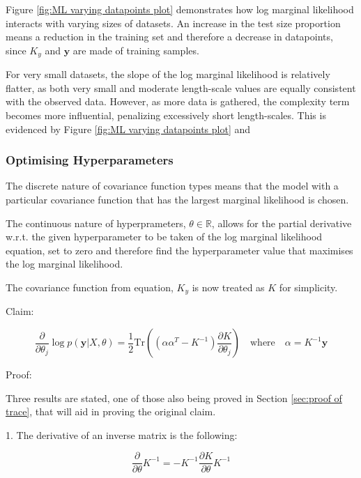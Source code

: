 \documentclass[12pt,a4paper]{article}
\begin{document}
Figure \ref{fig:ML varying datapoints plot} demonstrates how log marginal likelihood interacts with varying sizes of datasets. An increase in the test size proportion means a reduction in the training set and therefore a decrease in datapoints, since \(K_y\) and \(\mathbf{y}\) are made of training samples.

For very small datasets, the slope of the log marginal likelihood is relatively flatter, as both very small and moderate length-scale values are equally consistent with the observed data. However, as more data is gathered, the complexity term becomes more influential, penalizing excessively short length-scales. This is evidenced by Figure \ref{fig:ML varying datapoints plot} and \citet{williams2006gaussian}

\subsubsection{Optimising Hyperparameters}
\label{sec:optimisng hyperparameters}

The discrete nature of covariance function types means that the model with a particular covariance function that has the largest marginal likelihood is chosen. 

The continuous nature of hyperprameters, \(\theta \in \mathbb{R}\), allows for the partial derivative w.r.t. the given hyperparameter to be taken of the log marginal likelihood equation, set to zero and therefore find the hyperparameter value that maximises the log marginal likelihood.

The covariance function from equation, \(K_y\) is now treated as \(K\) for simplicity.

Claim: 

\begin{equation}
\frac{\partial}{\partial \theta_j} \log p(\mathbf{y} | X, \theta) = \frac{1}{2} \text{Tr} \left( \left( \alpha \alpha^T - K^{-1} \right) \frac{\partial K}{\partial \theta_j} \right) \quad \text{where} \quad \alpha = K^{-1} \mathbf{y}
\end{equation}

Proof:

Three results are stated, one of those also being proved in Section \ref{sec:proof of trace}, that will aid in proving the original claim.

1. The derivative of an inverse matrix is the following:

\begin{equation}
\frac{\partial}{\partial \theta} K^{-1} = -K^{-1} \frac{\partial K}{\partial \theta} K^{-1}
\label{eq:derivative of inverse matrix}
\end{equation}
\end{document}
